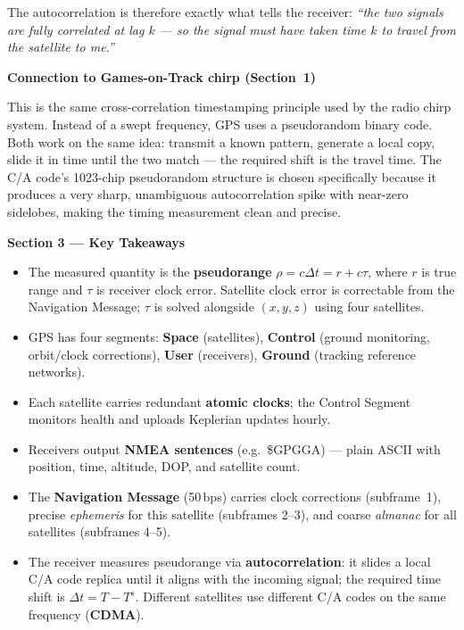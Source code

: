 \documentclass[12pt, a4paper]{article}
\begin{document}
The autocorrelation is therefore exactly what tells the receiver:
\emph{``the two signals are fully correlated at lag $k$ --- so the signal
must have taken time $k$ to travel from the satellite to me.''}

\begin{notebox}
  \textbf{Connection to Games-on-Track chirp (Section~1)}

  This is the same cross-correlation timestamping principle used by the
  radio chirp system.
  Instead of a swept frequency, GPS uses a pseudorandom binary code.
  Both work on the same idea: transmit a known pattern, generate a local
  copy, slide it in time until the two match --- the required shift is the
  travel time.
  The C/A code's 1023-chip pseudorandom structure is chosen specifically
  because it produces a very sharp, unambiguous autocorrelation spike with
  near-zero sidelobes, making the timing measurement clean and precise.
\end{notebox}

\begin{keybox}
  \textbf{Section 3 --- Key Takeaways}
  \begin{itemize}[leftmargin=1.2em,itemsep=2pt]
    \item The measured quantity is the \textbf{pseudorange}
      $\rho = c\Delta t = r + c\tau$, where $r$ is true range and $\tau$ is
      receiver clock error.
      Satellite clock error is correctable from the Navigation Message;
      $\tau$ is solved alongside $(x,y,z)$ using four satellites.
    \item GPS has four segments: \textbf{Space} (satellites), \textbf{Control}
      (ground monitoring, orbit/clock corrections), \textbf{User} (receivers),
      \textbf{Ground} (tracking reference networks).
    \item Each satellite carries redundant \textbf{atomic clocks}; the Control
      Segment monitors health and uploads Keplerian updates hourly.
    \item Receivers output \textbf{NMEA sentences} (e.g.\ \$GPGGA) --- plain
      ASCII with position, time, altitude, DOP, and satellite count.
    \item The \textbf{Navigation Message} (50\,bps) carries clock corrections
      (subframe~1), precise \emph{ephemeris} for this satellite (subframes 2--3),
      and coarse \emph{almanac} for all satellites (subframes 4--5).
    \item The receiver measures pseudorange via \textbf{autocorrelation}: it
      slides a local C/A code replica until it aligns with the incoming signal;
      the required time shift is $\Delta t = T - T^s$.
      Different satellites use different C/A codes on the same frequency
      (\textbf{CDMA}).
  \end{itemize}
\end{keybox}
\end{document}
